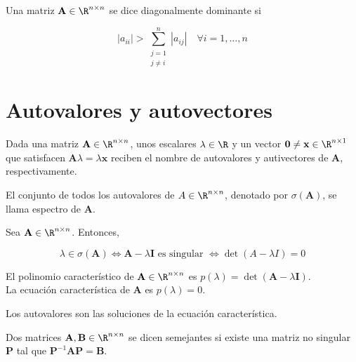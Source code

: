 \begin{defi}\label{def:diagonalmente_dominante}
Una matriz $\mathbf{A} \in \R^{n \times n}$ se dice diagonalmente dominante si 

\[ |a_{ii}| > \sum_{\substack{j=1 \\ j \neq i}}^{n} |a_{ij}| \quad \forall i = 1,\dots, n \]
\end{defi}



\section{Autovalores y autovectores}
\begin{defi}
Dada una matriz $\mathbf{A} \in \R^{n \times n}$, unos escalares $\lambda \in \R$ y un vector $\mathbf{0} \neq \mathbf{x} \in \R^{n \times 1}$ que satisfacen $\mathbf{A} \lambda = \lambda \mathbf{x}$ reciben el nombre de autovalores y autivectores de $\mathbf{A}$, respectivamente.
\end{defi}

\begin{defi}
El conjunto de todos los autovalores de $A \in \R^{n \times n}$, denotado por $\sigma(\mathbf{A})$, se llama espectro de $\mathbf{A}$.
\end{defi}

\begin{prop}
Sea $\mathbf{A} \in \R^{n \times n}$. Entonces,

\[ \lambda \in \sigma(\mathbf{A}) \iff \mathbf{A} - \lambda \mathbf{I} \text{ es singular } \iff \det(A - \lambda I) = 0 \] 
\end{prop}

\begin{defi}
El polinomio característico de $\mathbf{A} \in \R^{n \times n}$ es $p(\lambda) = \det(\mathbf{A} - \lambda \mathbf{I})$.\\

La ecuación característica de $\mathbf{A}$ es $p(\lambda) = 0$.
\end{defi}

\begin{defi}
Los autovalores son las soluciones de la ecuación característica.
\end{defi}

\begin{defi}
Dos matrices $\mathbf{A}, \mathbf{B} \in \R^{n \times n}$ se dicen semejantes si existe una matriz no singular $\mathbf{P}$ tal que $\mathbf{P}^{-1}\mathbf{A} \mathbf{P} = \mathbf{B}$.
\end{defi}

